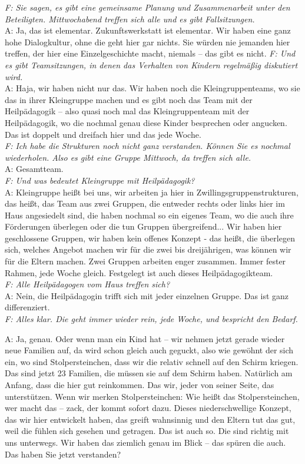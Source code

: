 \begin{linenumbers*}
\emph{F: Sie sagen, es gibt eine gemeinsame Planung und Zusammenarbeit unter den Beteiligten. Mittwochabend treffen sich alle und es gibt Fallsitzungen.}\\
A: Ja, das ist elementar. Zukunftswerkstatt ist elementar. Wir haben eine ganz hohe Dialogkultur, ohne die geht hier gar nichts. Sie würden nie jemanden hier treffen, der hier eine Einzelgeschichte macht, niemals -- das gibt es nicht.
\emph{F: Und es gibt Teamsitzungen, in denen das Verhalten von Kindern regelmäßig diskutiert wird.}\\
A: Haja, wir haben nicht nur das. Wir haben noch die Kleingruppenteams, wo sie das in ihrer Kleingruppe machen und es gibt noch das Team mit der Heilpädagogik -- also quasi noch mal das Kleingruppenteam mit der Heilpädagogik, wo die nochmal genau diese Kinder besprechen oder angucken. Das ist doppelt und dreifach hier 
und das jede Woche.\\
\emph{F: Ich habe die Strukturen noch nicht ganz verstanden. Können Sie es nochmal wiederholen. Also es gibt eine Gruppe Mittwoch, da treffen sich alle.}\\
A: Gesamtteam.\\        
\emph{F: Und was bedeutet Kleingruppe mit Heilpädagogik?}\\
A: Kleingruppe heißt bei uns, wir arbeiten ja hier in Zwillingsgruppenstrukturen, das heißt, das Team aus zwei Gruppen, die entweder rechts oder links hier im Haus angesiedelt sind, die haben nochmal so ein eigenes Team, wo die auch ihre Förderungen überlegen oder die tun Gruppen übergreifend... Wir haben hier geschlossene Gruppen, wir haben kein offenes Konzept - das heißt, die überlegen sich, welches Angebot machen wir für die zwei bis dreijährigen, was können wir für die Eltern machen. Zwei Gruppen arbeiten enger zusammen. Immer fester Rahmen, jede Woche gleich. Festgelegt ist auch dieses Heilpädagogikteam.\\
\emph{F: Alle Heilpädagogen vom Haus treffen sich?}\\
A: Nein, die Heilpädagogin trifft sich mit jeder einzelnen Gruppe. Das ist ganz differenziert.\\
\emph{F: Alles klar. Die geht immer wieder rein, jede Woche, und bespricht den Bedarf.} 

A: Ja, genau. Oder wenn man ein Kind hat -- wir nehmen jetzt gerade wieder neue Familien auf, da wird schon gleich auch geguckt, also wie gewöhnt der sich ein, wo sind Stolpersteinchen, dass wir die relativ schnell auf den Schirm kriegen. Das sind jetzt 23 Familien, die müssen sie auf dem Schirm haben. Natürlich am Anfang, dass die hier gut reinkommen. Das wir, jeder von seiner Seite, das unterstützen. Wenn wir merken Stolpersteinchen: Wie heißt das Stolpersteinchen, wer macht das -- zack, der kommt sofort dazu.
Dieses niederschwellige Konzept, das wir hier entwickelt haben, das greift wahnsinnig und den Eltern tut das gut, weil die fühlen sich gesehen und getragen. Das ist auch so. Die sind richtig mit uns unterwegs. Wir haben das ziemlich genau im Blick -- das spüren die auch. Das haben Sie jetzt verstanden?


\end{linenumbers*}
